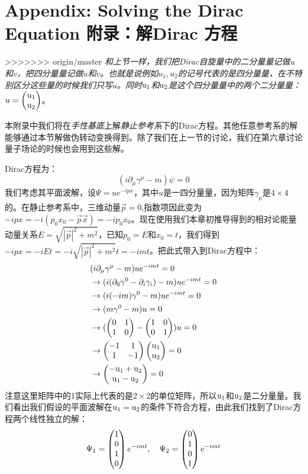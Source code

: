 \section[附录：解Dirac 方程]{Appendix: Solving the Dirac Equation 附录：解Dirac 方程}\label{sec8.9}
>>>>>>> origin/master
{\it 和上节一样，我们把Dirac自旋量中的二分量量记做{\rm u}和{\rm v}，把四分量量记做$u$和$v$。也就是说例如$u_1,u_2$的记号代表的是四分量量，在不特别区分这些量的时候我们只写$u$。同时${\rm u_1}$和${\rm u_2}$是这个四分量量中的两个二分量量：$u=\begin{pmatrix} \rm u_1 \\ \rm u_2 \end{pmatrix} $}。
\par
本附录中我们将在{\it 手性基底}上解{\it 静止参考系}下的Dirac方程。其他任意参考系的解能够通过本节解做伪转动变换得到。除了我们在上一节的讨论，我们在第六章讨论量子场论的时候也会用到这些解。\par
Dirac方程为：
\begin{equation}
(i\partial_\mu \gamma^\mu -m)\psi=0
\end{equation}
我们考虑其平面波解，设$\Psi=ue^{-ipx}$，其中$u$是一四分量量，因为矩阵$\gamma_\mu$是$4 \times 4$的。在静止参考系中，三维动量$\vec{p}=0$,指数项因此变为$-ipx=-i(p_0x_0-\vec{p}\vec{x})=-ip_0x_0$。现在使用我们本章初推导得到的相对论能量动量关系$E=\sqrt{|\vec{p}|^2+m^2}$，已知$p_0=E$和$x_0=t$，我们得到$-ipx=-iEt=-i\sqrt{|\vec{p}|^2+m^2}t=-imt$。把此式带入到Dirac方程中：
\begin{equation}
\begin{split}
&(i\partial_\mu\gamma^\mu-m)ue^{-imt}=0\\
&\to (i(\partial_0\gamma^0-\partial_i\gamma_i)-m)ue^{-imt}=0\\
&\to (i(-im)\gamma^0-m)ue^{-imt}=0\\
&\to (m\gamma^0-m)u=0\\
&\to (\begin{pmatrix} 0 & 1 \\ 1 & 0 \end{pmatrix} -\begin{pmatrix} 1 & 0 \\ 0 & 1 \end{pmatrix})u=0\\
&\to \begin{pmatrix} -1 & 1 \\ 1 & -1 \end{pmatrix} \begin{pmatrix} \rm u_1 \\ \rm u_2 \end{pmatrix} =0\\
&\to \begin{pmatrix} \rm -u_1+u_2 \\ \rm u_1-u_2 \end{pmatrix} =0
\end{split}
\end{equation}
注意这里矩阵中的1实际上代表的是$2 \times 2$的单位矩阵，所以$\rm u_1$和$\rm u_2$是二分量量。我们看出我们假设的平面波解在$\rm u_1 =u_2$的条件下符合方程，由此我们找到了Dirac方程两个线性独立的解：
\begin{equation}
\Psi_1=\begin{pmatrix} 1\\0\\1\\0 \end{pmatrix} e^{-imt},~~~\Psi_2=\begin{pmatrix} 0\\1\\0\\1 \end{pmatrix} e^{-imt}
\end{equation}
